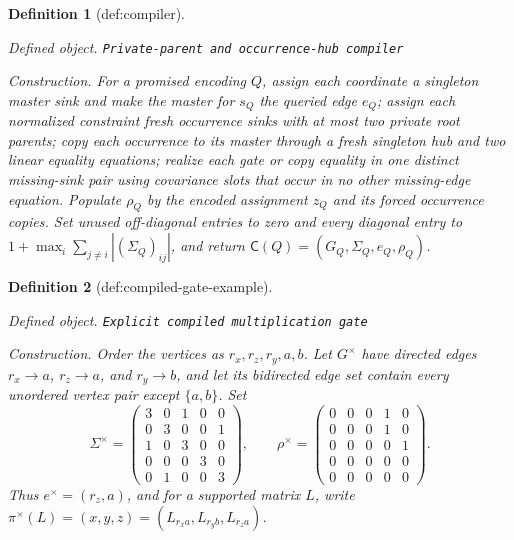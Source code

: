\documentclass{article}
\newtheorem{definition}{Definition}
\begin{document}
\begin{definition}[def:compiler]\label{def:compiler}
\par\smallskip\noindent\emph{Defined object.} \texttt{Private-\allowbreak{}parent and occurrence-\allowbreak{}hub compiler}
\par\smallskip\noindent\emph{Construction.} For a promised encoding \(Q\), assign each coordinate a singleton master sink and make the master for \(s_Q\) the queried edge \(e_Q\); assign each normalized constraint fresh occurrence sinks with at most two private root parents; copy each occurrence to its master through a fresh singleton hub and two linear equality equations; realize each gate or copy equality in one distinct missing-sink pair using covariance slots that occur in no other missing-edge equation. Populate \(\rho_Q\) by the encoded assignment \(z_Q\) and its forced occurrence copies. Set unused off-diagonal entries to zero and every diagonal entry to \(1+\max_i\sum_{j\ne i}|(\Sigma_Q)_{ij}|\), and return \(\mathsf C(Q)=(G_Q,\Sigma_Q,e_Q,\rho_Q)\).
\end{definition}

\begin{definition}[def:compiled-gate-example]\label{def:compiled-gate-example}
\par\smallskip\noindent\emph{Defined object.} \texttt{Explicit compiled multiplication gate}
\par\smallskip\noindent\emph{Construction.} Order the vertices as \(r_x,r_z,r_y,a,b\). Let \(G^{\times}\) have directed edges \(r_x\to a\), \(r_z\to a\), and \(r_y\to b\), and let its bidirected edge set contain every unordered vertex pair except \(\{a,b\}\). Set \[\Sigma^{\times}=\begin{pmatrix}3&0&1&0&0\\0&3&0&0&1\\1&0&3&0&0\\0&0&0&3&0\\0&1&0&0&3\end{pmatrix},\qquad \rho^{\times}=\begin{pmatrix}0&0&0&1&0\\0&0&0&1&0\\0&0&0&0&1\\0&0&0&0&0\\0&0&0&0&0\end{pmatrix}.\] Thus \(e^{\times}=(r_z,a)\), and for a supported matrix \(L\), write \(\pi^{\times}(L)=(x,y,z)=(L_{r_xa},L_{r_yb},L_{r_za})\).
\end{definition}
\end{document}
